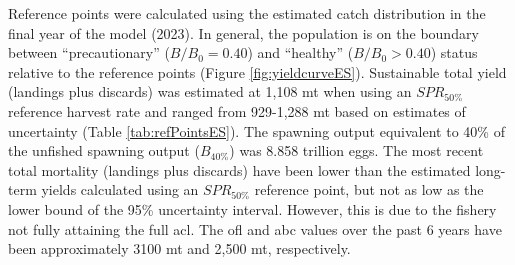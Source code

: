 \documentclass[11pt,
  letterpaper,
]{article}
\begin{document}
Reference points were calculated using the estimated catch distribution in the final year of the model (2023). In general, the population is on the boundary between ``precautionary'' (\(B/B_0 = 0.40\)) and ``healthy'' (\(B/B_0 > 0.40\)) status relative to the reference points (Figure \ref{fig:yieldcurveES}). Sustainable total yield (landings plus discards) was estimated at 1,108 mt when using an \(SPR_{50\%}\) reference harvest rate and ranged from 929-1,288 mt based on estimates of uncertainty (Table \ref{tab:refPointsES}). The spawning output equivalent to 40\% of the unfished spawning output (\(B_{40\%}\)) was 8.858 trillion eggs. The most recent total mortality (landings plus discards) have been lower than the estimated long-term yields calculated using an \(SPR_{50\%}\) reference point, but not as low as the lower bound of the 95\% uncertainty interval. However, this is due to the fishery not fully attaining the full \gls{acl}. The \gls{ofl} and \gls{abc} values over the past 6 years have been approximately 3100 mt and 2,500 mt, respectively.

\begingroup\fontsize{10}{12}\selectfont
\begingroup\fontsize{10}{12}\selectfont
\end{document}
